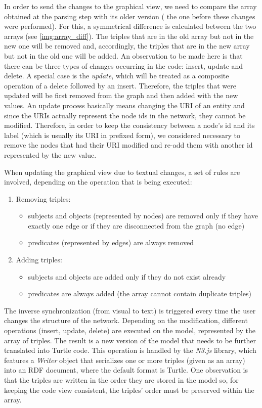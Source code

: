 In order to send the changes to the graphical view, we need to compare the array obtained at the parsing step with its older version ( the one before these changes were performed). For this, a symmetrical difference is calculated between the two arrays (see \autoref{img:array_diff}). The triples that are in the old array but not in the new one will be removed and, accordingly, the triples that are in the new array but not in the old one will be added. An observation to be made here is that there can be three types of changes occurring in the code: insert, update and delete. A special case is the \textit{update}, which will be treated as a composite operation of a delete followed by an insert. Therefore, the triples that were updated will be first removed from the graph and then added with the new values. An update process basically means changing the URI of an entity and since the URIs actually represent the node ids in the network, they cannot be modified. Therefore, in order to keep the consistency between a node's id and its label (which is usually its URI in prefixed form), we considered necessary to remove the nodes that had their URI modified and re-add them with another id represented by the new value.

When updating the graphical view due to textual changes, a set of rules are involved, depending on the operation that is being executed:

\begin{enumerate}
	\item Removing triples:
	\begin{itemize}
		\item subjects and objects (represented by nodes) are removed only if they have exactly one edge or if they are disconnected from the graph (no edge)
		\item predicates (represented by edges) are always removed
	\end{itemize}
	\item Adding triples:
	\begin{itemize}
		\item subjects and objects are added only if they do not exist already
		\item predicates are always added (the array cannot contain duplicate triples)
	\end{itemize}
\end{enumerate}

The inverse synchronization (from visual to text) is triggered every time the user changes the structure of the network. Depending on the modification, different operations (insert, update, delete) are executed on the model, represented by the array of triples. The result is a new version of the model that needs to be further translated into Turtle code. This operation is handled by the \textit{N3.js} library, which features a \textit{Writer} object that serializes one or more triples (given as an array) into an RDF document, where the default format is Turtle. One observation is that the triples are written in the order they are stored in the model so, for keeping the code view consistent, the triples' order must be preserved within the array.


